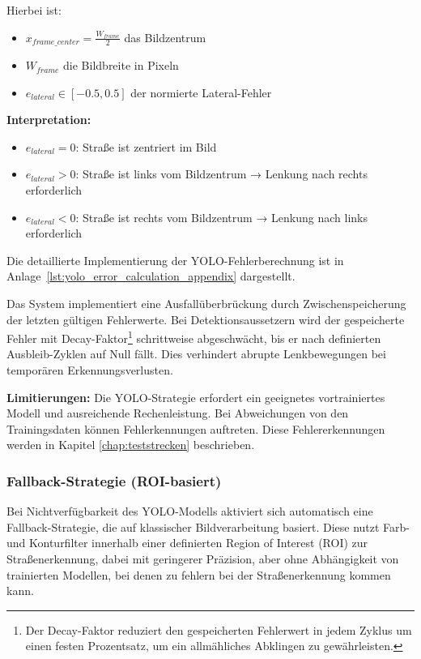 Hierbei ist:
\begin{itemize}
    \item $x_{frame\_center} = \frac{W_{frame}}{2}$ das Bildzentrum
    \item $W_{frame}$ die Bildbreite in Pixeln
    \item $e_{lateral} \in [-0.5, 0.5]$ der normierte Lateral-Fehler
\end{itemize}

\textbf{Interpretation:}
\begin{itemize}
    \item $e_{lateral} = 0$: Straße ist zentriert im Bild
    \item $e_{lateral} > 0$: Straße ist links vom Bildzentrum → Lenkung nach rechts erforderlich
    \item $e_{lateral} < 0$: Straße ist rechts vom Bildzentrum → Lenkung nach links erforderlich
\end{itemize}

Die detaillierte Implementierung der YOLO-Fehlerberechnung ist in Anlage~\ref{lst:yolo_error_calculation_appendix} dargestellt.



Das System implementiert eine Ausfallüberbrückung durch Zwischenspeicherung 
der letzten gültigen Fehlerwerte. Bei Detektionsaussetzern wird der gespeicherte Fehler mit Decay-Faktor\footnote{Der Decay-Faktor reduziert den gespeicherten Fehlerwert in jedem Zyklus um einen festen Prozentsatz, um ein allmähliches Abklingen zu gewährleisten.} schrittweise 
abgeschwächt, bis er nach definierten Ausbleib-Zyklen auf Null fällt. Dies verhindert abrupte Lenkbewegungen bei 
temporären Erkennungsverlusten.




\textbf{Limitierungen:} Die YOLO-Strategie erfordert ein geeignetes vortrainiertes Modell und ausreichende 
Rechenleistung. Bei Abweichungen von den Trainingsdaten können Fehlerkennungen auftreten. Diese Fehlererkennungen 
werden in Kapitel \ref{chap:teststrecken} beschrieben. 



\subsubsection{Fallback-Strategie (ROI-basiert)}

Bei Nichtverfügbarkeit des YOLO-Modells aktiviert sich automatisch eine Fallback-Strategie, die auf klassischer 
Bildverarbeitung basiert. Diese nutzt Farb- und Konturfilter innerhalb einer definierten Region of Interest (ROI) 
zur Straßenerkennung, dabei mit geringerer Präzision, aber ohne Abhängigkeit von trainierten Modellen, bei 
denen zu fehlern bei der Straßenerkennung kommen kann.

